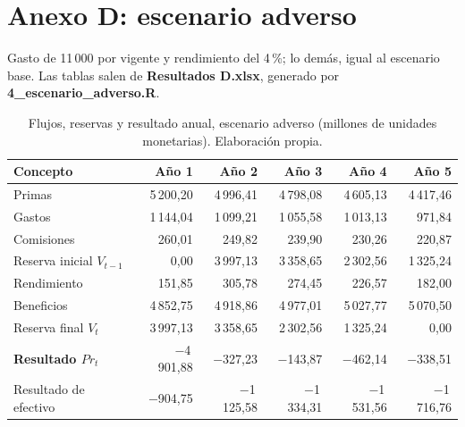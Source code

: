 \documentclass[11pt]{article}
\begin{document}
\clearpage

\section*{Anexo D: escenario adverso}

Gasto de 11\,000 por vigente y rendimiento del 4\,\%; lo demás, igual al escenario base. Las tablas salen de \textbf{Resultados D.xlsx}, generado por \textbf{4\_escenario\_adverso.R}.

\begin{table}[htbp]
\centering
\small
\begin{tabular}{lrrrrr}
\toprule
\textbf{Concepto} & \textbf{Año 1} & \textbf{Año 2} & \textbf{Año 3} & \textbf{Año 4} & \textbf{Año 5}\\
\midrule
Primas & 5\,200,20 & 4\,996,41 & 4\,798,08 & 4\,605,13 & 4\,417,46 \\
Gastos & 1\,144,04 & 1\,099,21 & 1\,055,58 & 1\,013,13 & 971,84 \\
Comisiones & 260,01 & 249,82 & 239,90 & 230,26 & 220,87 \\
Reserva inicial $V_{t-1}$ & 0,00 & 3\,997,13 & 3\,358,65 & 2\,302,56 & 1\,325,24 \\
Rendimiento & 151,85 & 305,78 & 274,45 & 226,57 & 182,00 \\
Beneficios & 4\,852,75 & 4\,918,86 & 4\,977,01 & 5\,027,77 & 5\,070,50 \\
Reserva final $V_t$ & 3\,997,13 & 3\,358,65 & 2\,302,56 & 1\,325,24 & 0,00 \\
\midrule
\textbf{Resultado $Pr_t$} & $-$4\,901,88 & $-$327,23 & $-$143,87 & $-$462,14 & $-$338,51 \\
Resultado de efectivo & $-$904,75 & $-$1\,125,58 & $-$1\,334,31 & $-$1\,531,56 & $-$1\,716,76 \\
\bottomrule
\end{tabular}
\caption{Flujos, reservas y resultado anual, escenario adverso (millones de unidades monetarias). Elaboración propia.}
\end{table}
\end{document}

